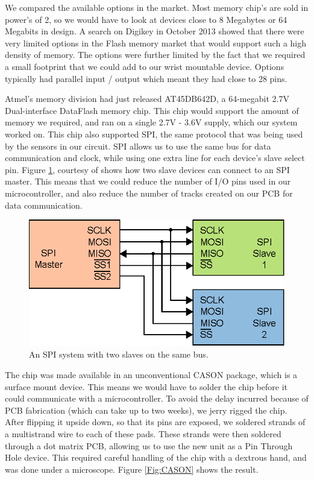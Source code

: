We compared the available options in the market. Most memory chip's are sold in power's of 2, so we would have to look at devices close to 8 Megabytes or 64 Megabits in design. A search on Digikey in October 2013 showed that there were very limited options in the Flash memory market that would support such a high density of memory. The options were further limited by the fact that we required a small footprint that we could add to our wrist mountable device. Options typically had parallel input / output which meant they had close to 28 pins.

Atmel's memory division had just released AT45DB642D, a 64-megabit 2.7V Dual-interface DataFlash memory chip. This chip would support the amount of memory we required, and ran on a single 2.7V - 3.6V supply, which our system worked on. This chip also supported SPI, the same protocol that was being used by the sensors in our circuit. SPI allows us to use the same bus for data communication and clock, while using one extra line for each device's slave select pin. Figure \ref{Fig:SPISLAVES}, courtesy of \cite{Web:WikiCBurnett} shows how two slave devices can connect to an SPI master. This means that we could reduce the number of I/O pins used in our microcontroller, and also reduce the number of tracks created on our PCB for data communication.

\begin{figure}
\begin{center}
\includegraphics{images/SPI_SLAVES.eps}
\caption{An SPI system with two slaves on the same bus.}
\label{Fig:SPISLAVES}
\end{center}
\end{figure}

The chip was made available in an unconventional CASON package, which is a surface mount device. This means we would have to solder the chip before it could communicate with a microcontroller. To avoid the delay incurred because of PCB fabrication (which can take up to two weeks), we jerry rigged the chip. After flipping it upside down, so that its pins are exposed, we soldered strands of a multistrand wire to each of these pads. These strands were then soldered through a dot matrix PCB, allowing us to use the new unit as a Pin Through Hole device. This required careful handling of the chip with a dextrous hand, and was done under a microscope. Figure \ref{Fig:CASON} shows the result. 

